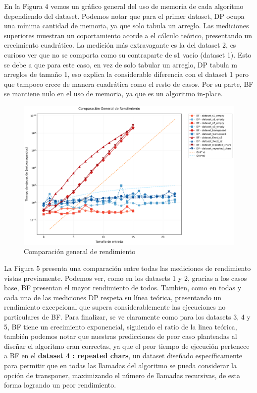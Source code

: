 En la Figura 4 vemos un gráfico general del uso de memoria de cada algoritmo dependiendo del dataset. Podemos notar que para el primer dataset, 
DP ocupa una mínima cantidad de memoria, ya que solo tabula un arreglo. Las mediciones superiores muestran un coportamiento acorde a 
el cálculo teórico, presentando un crecimiento cuadrático. La medición más extravagante es la del dataset 2, es curioso ver que no se comporta como 
su contraparte de s1 vacío (dataset 1). Esto se debe a que para este caso, en vez de solo tabular un arreglo, DP tabula m arreglos de tamaño 1, 
eso explica la considerable diferencia con el dataset 1 pero que tampoco crece de manera cuadrática como el resto de casos. Por su parte, BF se mantiene 
nulo en el uso de memoria, ya que es un algoritmo in-place.

\begin{figure}[H]
    \centering
        \includegraphics[width=\textwidth]{images/comparacion_general.png}   
    \caption{Comparación general de rendimiento}
    \label{fig:general}
\end{figure}

La Figura 5 presenta una comparación entre todas las mediciones de rendimiento vistas previamente. Podemos ver, como en los datasets 1 y 2, gracias a los casos base, BF 
presentan el mayor rendimiento de todos. Tambien, como en todas y cada una de las mediciones DP respeta su línea teórica, presentando un rendimiento excepcional que supera 
considerablemente las ejecuciones no particulares de BF. Para finalizar, se ve claramente como para los datasets 3, 4 y 5, BF tiene un crecimiento exponencial, siguiendo 
el ratio de la linea teórica, también podemos notar que nuestras predicciones de peor caso planteadas al diseñar el algoritmo eran correctas, ya que el peor tiempo de ejecución 
pertenece a BF en el \textbf{dataset 4 : repeated chars}, un dataset diseñado específicamente para permitir que en todas las llamadas del algoritmo se pueda considerar la opción de 
transponer, maximizando el número de llamadas recursivas, de esta forma logrando un peor rendimiento. 




